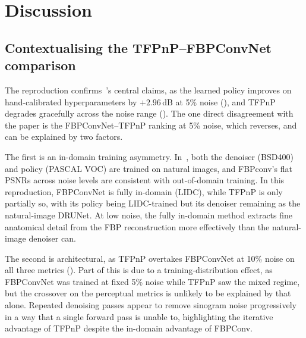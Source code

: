 
\chapter{Discussion}
\label{chap:discussion}

\section{Contextualising the TFPnP–FBPConvNet comparison}
\label{sec:why-fbpconvnet}

The reproduction confirms~\citet{Wei2022TFPnP}'s central claims, as the learned policy improves on hand-calibrated hyperparameters by $+2.96$\,dB at 5\% noise (), and TFPnP degrades gracefully across the noise range (). The one direct disagreement with the paper is the FBPConvNet–TFPnP ranking at 5\% noise, which reverses, and can be explained by two factors.

The first is an in-domain training asymmetry. In~\citet{Wei2022TFPnP}, both the denoiser (BSD400) and policy (PASCAL VOC) are trained on natural images, and FBPconv's flat PSNRs across noise levels are consistent with out-of-domain training. In this reproduction, FBPConvNet is fully in-domain (LIDC), while TFPnP is only partially so, with its policy being LIDC-trained but its denoiser remaining as the natural-image DRUNet. At low noise, the fully in-domain method extracts fine anatomical detail from the FBP reconstruction more effectively than the natural-image denoiser can.

The second is architectural, as TFPnP overtakes FBPConvNet at 10\% noise on all three metrics (). Part of this is due to a training-distribution effect, as FBPConvNet was trained at fixed 5\% noise while TFPnP saw the mixed regime, but the crossover on the perceptual metrics is unlikely to be explained by that alone. Repeated denoising passes appear to remove sinogram noise progressively in a way that a single forward pass is unable to, highlighting the iterative advantage of TFPnP despite the in-domain advantage of FBPConv.

